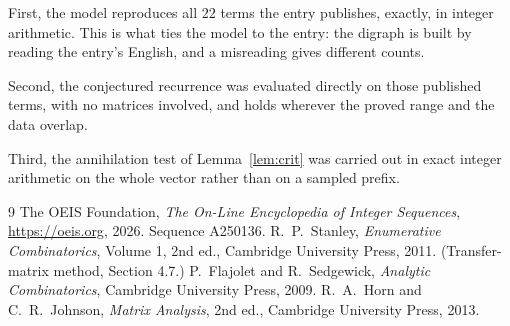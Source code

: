 \documentclass[11pt,a4paper]{article}
\theoremstyle{plain}
\theoremstyle{definition}
\begin{document}
First, the model reproduces all $22$ terms the entry publishes, exactly, in integer
arithmetic. This is what ties the model to the entry: the digraph is built by reading the
entry's English, and a misreading gives different counts.

Second, the conjectured recurrence was evaluated directly on those published terms, with no
matrices involved, and holds wherever the proved range and the data overlap.

Third, the annihilation test of Lemma~\ref{lem:crit} was carried out in exact integer
arithmetic on the whole vector rather than on a sampled prefix.

\begin{thebibliography}{9}
 The OEIS Foundation, \emph{The On-Line Encyclopedia of Integer
Sequences}, \url{https://oeis.org}, 2026. Sequence A250136.
 R.~P.~Stanley, \emph{Enumerative Combinatorics}, Volume 1, 2nd ed.,
Cambridge University Press, 2011. (Transfer-matrix method, Section 4.7.)
 P.~Flajolet and R.~Sedgewick, \emph{Analytic Combinatorics}, Cambridge
University Press, 2009.
 R.~A.~Horn and C.~R.~Johnson, \emph{Matrix Analysis}, 2nd ed., Cambridge
University Press, 2013.
\end{thebibliography}
\end{document}
